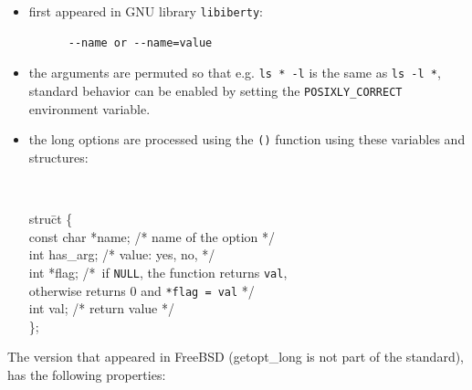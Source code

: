 

\begin{slide}
\setlength{\baselineskip}{0.8\baselineskip}
\begin{itemize}
\item first appeared in GNU library \texttt{libiberty}: 
\begin{verbatim}
      --name or --name=value
\end{verbatim}
\item the arguments are permuted so that e.g.
\verb#ls * -l# is the same as \verb#ls -l *#, standard behavior can be enabled
by setting the \verb#POSIXLY_CORRECT# environment variable.
\item the long options are processed using the \texttt{()}
function using these variables and structures:
{\tt
\begin{tabbing}
stru\=ct  \{\\
\>const char *name; \textrm{/* name of the option */} \\
\>int has\_arg; \textrm{/* value: yes, no,  */} \\
\>int *flag; \textrm{/*~}\=\textrm{if \texttt{NULL}, the function returns
\texttt{val}}, \\
\>\>\textrm{otherwise returns 0}
\textrm{and }\texttt{*flag = val}\textrm{ */} \\
\>int val; \textrm{/* return value */} \\
\};
\end{tabbing}}
\end{itemize}
\end{slide}

The version that appeared in FreeBSD (\textrm{getopt\_long} is not part
of the standard), has the following properties:

